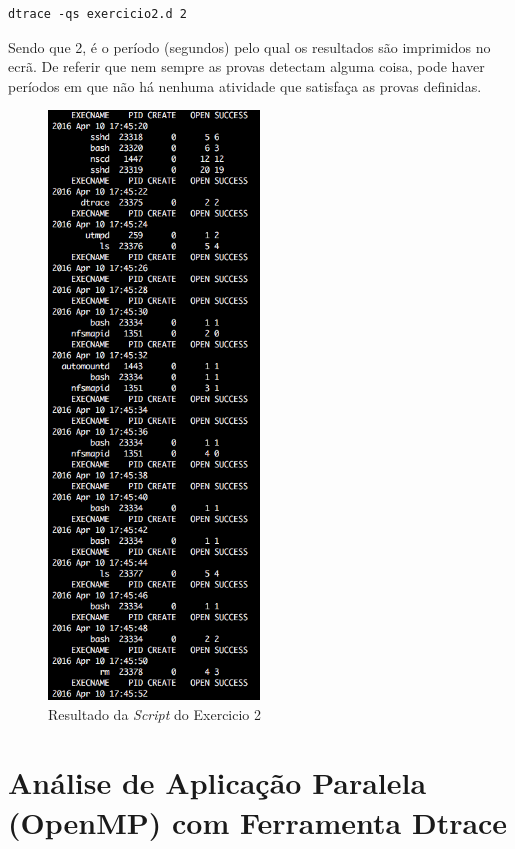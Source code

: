 \documentclass[conference,compsoc]{IEEEtran}
\begin{document}
\begin{lstlisting}
dtrace -qs exercicio2.d 2
\end{lstlisting}

Sendo que 2, é o período (segundos) pelo qual os resultados são imprimidos no ecrã. De referir que nem sempre as provas detectam alguma coisa, pode haver períodos em que não há nenhuma atividade que satisfaça as provas definidas.

\begin{figure}[H]
\begin{center}
\includegraphics[width=0.5\textwidth]{Tables/ex2.png}
\caption{Resultado da \textit{Script} do Exercicio 2}
\label{fig:ex2}
\end{center}
\end{figure}

\section{Análise de Aplicação Paralela (OpenMP) com Ferramenta Dtrace}
\end{document}
